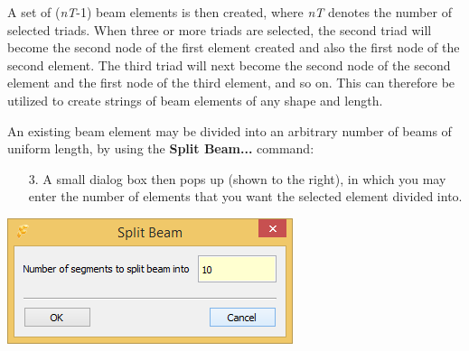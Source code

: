 A set of ({\sl nT}-1) beam elements is then created, where {\sl nT}
denotes the number of selected triads. When three or more triads are
selected, the second triad will become the second node of the first
element created and also the first node of the second element. The third
triad will next become the second node of the second element and the
first node of the third element, and so on. This can therefore be
utilized to create strings of beam elements of any shape and length.


\clearpage
{}

An existing beam element may be divided into an arbitrary number of
beams of uniform length, by using the \textbf{Split Beam...} command:

\vskip11mm
\begin{minipage}{0.62\textwidth}
  \raggedright
  \begin{itemize}
  \item[3.]
    A small dialog box then pops up (shown to the right), in which you may enter
    the number of elements that you want the selected element divided into.
  \end{itemize}
\end{minipage}%
\hfill\begin{minipage}{0.35\textwidth}
  \includegraphics[width=\textwidth]{Figures/Dialogs/4-SplitBeam}
\end{minipage}

